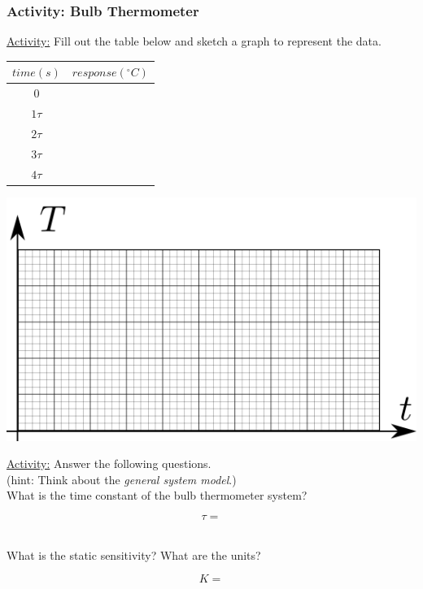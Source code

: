\documentclass[fleqn]{beamer} %
\newcommand{\sectionIIsubsectionIVtitle}{Activity: Bulb Thermometer}
\begin{document}
			\begin{frame}
				\frametitle{\sectionIIsubsectionIVtitle}

				{\scriptsize \underline{Activity:} Fill out the table below and sketch a graph to represent the data. }

\begin{multicols}{2}

\renewcommand{\arraystretch}{1.5}
\begin{tabular}{|c|c|} \hline
$time (s)$&$response (^\circ C)$\\ \hline
0&\\ \hline
$1\tau$&\\ \hline
$2\tau$&\\ \hline
$3\tau$&\\ \hline
$4\tau$&\\ \hline
\end{tabular}

\includegraphics[scale=0.5]{images/temp_versus_time.png} 	
\end{multicols}



			\end{frame}

			\begin{frame}

			{\scriptsize \underline{Activity:} Answer the following questions. }\\{ \tiny (hint: Think about the {\it general system model}.)}\\


What is the time constant of the bulb thermometer system? 

\vspace{5mm}
\begin{fleqn}
\[ \tau= \]
\end{fleqn}
\vspace{5mm}\\What is the static sensitivity? What are the units?
\vspace{5mm}
\begin{fleqn}
\[ K= \]
\end{fleqn}
\vspace{8mm}


			\end{frame}
\end{document}
